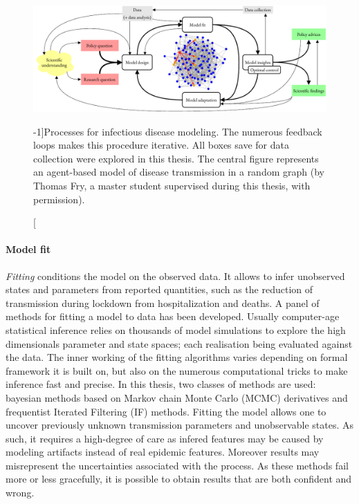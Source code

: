  \begin{figure}\centering
  \includegraphics{fig/modeling_cycle}
  \caption[Processes for infectious disease modeling][-1\baselineskip]{Processes for  infectious disease modeling. The numerous feedback loops makes this procedure iterative. All boxes save for data collection were explored in this thesis. The central figure represents an agent-based model of disease transmission in a random graph (by Thomas Fry, a master student supervised during this thesis, with permission).}\label{fig:modeling}
\end{figure}
\paragraph{Model fit} \textit{Fitting} conditions the model on the observed data. It allows to infer unobserved states and parameters from reported quantities, such as the reduction of transmission during lockdown from hospitalization and deaths. A panel of methods for fitting a model to data has been developed. Usually computer-age statistical inference relies on thousands of model simulations to explore the high dimensionals parameter and state spaces; each realisation being evaluated against the data. The inner working of the fitting algorithms varies depending on formal framework it is built on, but also on the numerous computational tricks to make inference fast and precise. In this thesis, two classes of methods are used: bayesian methods based on Markov chain Monte Carlo (MCMC) derivatives and frequentist Iterated Filtering (IF) methods. Fitting the model allows one to uncover previously unknown transmission parameters and unobservable states. As such, it requires a high-degree of care as infered features may be caused by modeling artifacts instead of real epidemic features. Moreover results may misrepresent the uncertainties associated with the process. As these methods fail more or less gracefully, it is possible to obtain results that are both confident and wrong.
 
